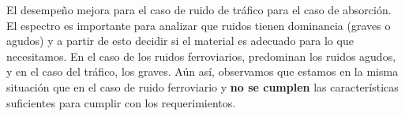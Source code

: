 \par El desempeño mejora para el caso de ruido de tráfico para el caso de absorción. El espectro es importante para analizar que ruidos tienen dominancia (graves o agudos) y a partir de esto decidir si el material es adecuado para lo que necesitamos. En el caso de los ruidos ferroviarios, predominan los ruidos agudos, y en el caso del tráfico, los graves. Aún así, observamos que estamos en la misma situación que en el caso de ruido ferroviario y \textbf{no se cumplen} las características suficientes para cumplir con los requerimientos.



